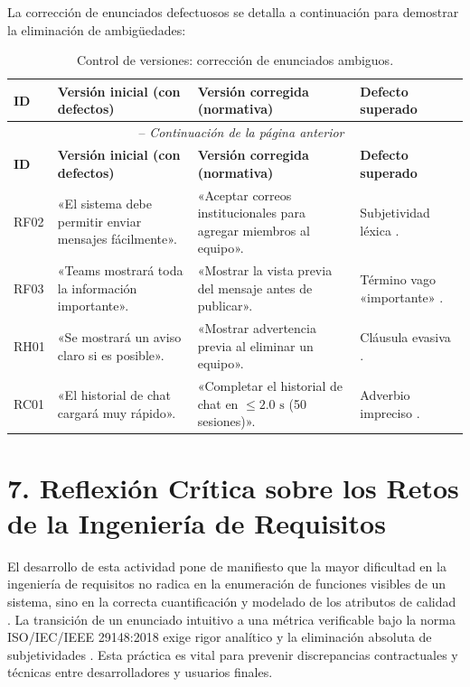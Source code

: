 \documentclass[11pt,a4paper]{article}
\begin{document}
	La corrección de enunciados defectuosos se detalla a continuación para demostrar la eliminación de ambigüedades:
	
	\begin{longtable}{p{1.0cm} p{4.6cm} p{5.2cm} p{3.2cm}}
		\caption{Control de versiones: corrección de enunciados ambiguos.} \\
		\toprule
		\textbf{ID} & \textbf{Versión inicial (con defectos)} & \textbf{Versión corregida (normativa)} & \textbf{Defecto superado} \\
		\midrule
		\endfirsthead
		\multicolumn{4}{c}{\tablename\ \thetable\ -- \textit{Continuación de la página anterior}} \\
		\toprule
		\textbf{ID} & \textbf{Versión inicial (con defectos)} & \textbf{Versión corregida (normativa)} & \textbf{Defecto superado} \\
		\midrule
		\endhead
		\bottomrule
		\endfoot
		RF02 & «El sistema debe permitir enviar mensajes fácilmente». & «Aceptar correos institucionales para agregar miembros al equipo». & Subjetividad léxica \cite{iso29148_2018}. \\
		RF03 & «Teams mostrará toda la información importante». & «Mostrar la vista previa del mensaje antes de publicar». & Término vago «importante» \cite{iso29148_2018}. \\
		RH01 & «Se mostrará un aviso claro si es posible». & «Mostrar advertencia previa al eliminar un equipo». & Cláusula evasiva \cite{iso29148_2018}. \\
		RC01 & «El historial de chat cargará muy rápido». & «Completar el historial de chat en $\le 2.0\text{ s}$ (50 sesiones)». & Adverbio impreciso \cite{iso25010_2023}. \\
		\bottomrule
	\end{longtable}
	
	\section*{\textbf{7. Reflexión Crítica sobre los Retos de la Ingeniería de Requisitos}}
	El desarrollo de esta actividad pone de manifiesto que la mayor dificultad en la ingeniería de requisitos no radica en la enumeración de funciones visibles de un sistema, sino en la correcta cuantificación y modelado de los atributos de calidad \cite{iso25010_2023}. La transición de un enunciado intuitivo a una métrica verificable bajo la norma ISO/IEC/IEEE 29148:2018 exige rigor analítico y la eliminación absoluta de subjetividades \cite{iso29148_2018}. Esta práctica es vital para prevenir discrepancias contractuales y técnicas entre desarrolladores y usuarios finales.
	
\end{document}
